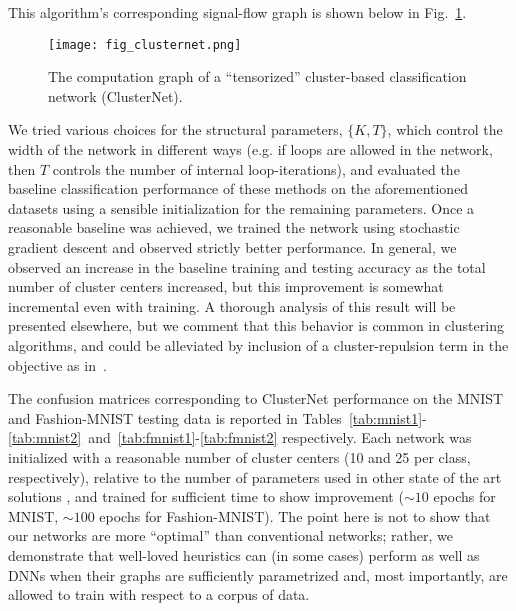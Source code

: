 \documentclass{article}
\begin{document}
This algorithm's corresponding signal-flow graph is shown below in Fig.~\ref{fig:cluster_graph}.
\begin{figure}[hbt!]
    \centering
    \texttt{[image: fig\_clusternet.png]}
    \caption{The computation graph of a ``tensorized'' cluster-based classification network (ClusterNet).} \label{fig:cluster_graph}
    \vspace{-3mm}
\end{figure}

We tried various choices for the structural parameters, $\{K,T\}$, which control the width of the network in different ways (e.g. if loops are allowed in the network, then $T$ controls the number of internal loop-iterations), and evaluated the baseline classification performance of these methods on the aforementioned datasets using a sensible initialization for the remaining parameters. Once a reasonable baseline was achieved, we trained the network using stochastic gradient descent and observed strictly better performance. In general, we observed an increase in the baseline training and testing accuracy as the total number of cluster centers increased, but this improvement is somewhat incremental even with training. A thorough analysis of this result will be presented elsewhere, but we comment that this behavior is common in clustering algorithms, and could be alleviated by inclusion of a cluster-repulsion term in the objective as in~\cite{chandrasekaran2017fast}.

The confusion matrices corresponding to ClusterNet performance on the MNIST and Fashion-MNIST testing data is reported in Tables~\ref{tab:mnist1}-\ref{tab:mnist2}~and~\ref{tab:fmnist1}-\ref{tab:fmnist2} respectively. Each network was initialized with a reasonable number of cluster centers (10 and 25 per class, respectively), relative to the number of parameters used in other state of the art solutions \cite{rawat2017deep}, and trained for sufficient time to show improvement ($\sim10$ epochs for MNIST, $\sim100$ epochs for Fashion-MNIST). The point here is not to show that our networks are more ``optimal'' than conventional networks; rather, we demonstrate that well-loved heuristics can (in some cases) perform as well as DNNs when their graphs are sufficiently parametrized and, most importantly, are allowed to train with respect to a corpus of data.
\end{document}
